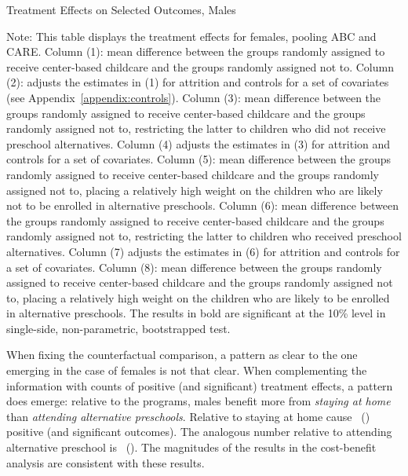 \begin{table}[H] 
\begin{threeparttable}
\caption{Treatment Effects on Selected Outcomes, Males}
\label{table:males}
\centering
\scalebox{.97}{ 
}
\begin{tablenotes}
\footnotesize
\item Note: This table displays the treatment effects for females, pooling ABC and CARE. Column (1): mean difference between the groups randomly assigned to receive center-based childcare and the groups randomly assigned not to. Column (2): adjusts the estimates in (1) for attrition and controls for a set of covariates (see Appendix~\ref{appendix:controls}). Column (3): mean difference between the groups randomly assigned to receive center-based childcare and the groups randomly assigned not to, restricting the latter to children who did not receive preschool alternatives. Column (4) adjusts the estimates in (3) for attrition and controls for a set of covariates. Column (5): mean difference between the groups randomly assigned to receive center-based childcare and the groups randomly assigned not to, placing a relatively high weight on the children who are likely not to be enrolled in alternative preschools. Column (6): mean difference between the groups randomly assigned to receive center-based childcare and the groups randomly assigned not to, restricting the latter to children who received preschool alternatives. Column (7) adjusts the estimates in (6) for attrition and controls for a set of covariates. Column (8): mean difference between the groups randomly assigned to receive center-based childcare and the groups randomly assigned not to, placing a relatively high weight on the children who are likely to be enrolled in alternative preschools. The results in bold are significant at the 10\% level in single-side, non-parametric, bootstrapped test.
\end{tablenotes}
\end{threeparttable}
\end{table}

\noindent When fixing the counterfactual comparison, a pattern as clear to the one emerging in the case of females is not that clear. When complementing the information with counts of positive (and significant) treatment effects, a pattern does emerge: relative to the programs, males benefit more from \textit{staying at home} than \textit{attending alternative preschools}. Relative to staying at home cause \positivecsnm\ (\positivescsnm) positive (and significant outcomes). The analogous number relative to attending alternative preschool is \positivecsam\ (\positivescsam). The magnitudes of the results in the cost-benefit analysis are  consistent with these results.

